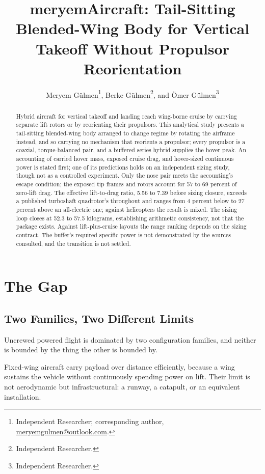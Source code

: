 \documentclass[journal]{new-aiaa}
\title{meryemAircraft: Tail-Sitting Blended-Wing Body for Vertical Takeoff Without Propulsor Reorientation}
\author{Meryem G\"ulmen\footnote{Independent Researcher; corresponding author, \protect\url{meryemgulmen@outlook.com}.}, Berke G\"ulmen\footnote{Independent Researcher.}, and \"Omer G\"ulmen\footnote{Independent Researcher.}}
\affil{Independent Researcher, Ankara, T\"urkiye}
\date{}
\begin{document}
\maketitle

\begin{abstract}

Hybrid aircraft for vertical takeoff and landing reach wing-borne cruise by carrying separate lift rotors or by reorienting their propulsors. This analytical study presents a tail-sitting blended-wing body arranged to change regime by rotating the airframe instead, and so carrying no mechanism that reorients a propulsor; every propulsor is a coaxial, torque-balanced pair, and a buffered series hybrid supplies the hover peak. An accounting of carried hover mass, exposed cruise drag, and hover-sized continuous power is stated first; one of its predictions holds on an independent sizing study, though not as a controlled experiment. Only the nose pair meets the accounting's escape condition; the exposed tip frames and rotors account for 57 to 69 percent of zero-lift drag. The effective lift-to-drag ratio, 5.56 to 7.39 before sizing closure, exceeds a published turboshaft quadrotor's throughout and ranges from 4 percent below to 27 percent above an all-electric one; against helicopters the result is mixed. The sizing loop closes at 52.3 to 57.5 kilograms, establishing arithmetic consistency, not that the package exists. Against lift-plus-cruise layouts the range ranking depends on the sizing contract. The buffer's required specific power is not demonstrated by the sources consulted, and the transition is not settled.

\end{abstract}



\section{The Gap}

\subsection{Two Families, Two Different Limits}

Uncrewed powered flight is dominated by two configuration families, and neither is bounded by the thing the other is bounded by.

Fixed-wing aircraft carry payload over distance efficiently, because a wing sustains the vehicle without continuously spending power on lift. Their limit is not aerodynamic but infrastructural: a runway, a catapult, or an equivalent installation.
\end{document}
